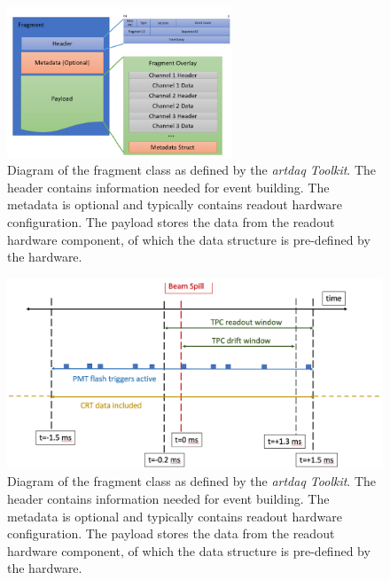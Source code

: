 \begin{figure}[htbp!] 
\centering    
\includegraphics[width=0.6\textwidth]{Fragment_Diagram}
\caption[Fragment_Diagram]{Diagram of the fragment class as defined by the \textit{artdaq Toolkit}. The header contains information needed for event building. The metadata is optional and typically contains readout hardware configuration. The payload stores the data from the readout hardware component, of which the data structure is pre-defined by the hardware. }
\label{fig:fragment_diagram}
\end{figure}

\begin{figure}[htbp!] 
\centering    
\includegraphics[width=1.0\textwidth]{SBND_Event_Structure}
\caption[SBND_Event_Structure]{Diagram of the fragment class as defined by the \textit{artdaq Toolkit}. The header contains information needed for event building. The metadata is optional and typically contains readout hardware configuration. The payload stores the data from the readout hardware component, of which the data structure is pre-defined by the hardware. }
\label{fig:sbnd_event_structure}
\end{figure}

